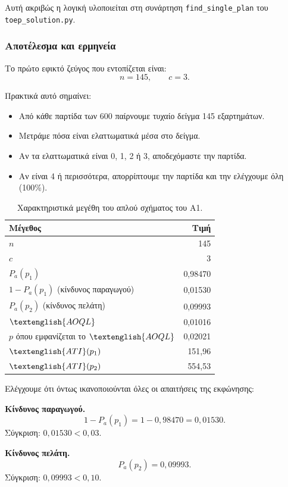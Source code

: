 \documentclass[12pt,a4paper]{article}
\newcommand{\code}[1]{\texttt{\textenglish{#1}}}
\newcommand{\Pa}{P_{\!a}}
\newcommand{\AOQL}{\textenglish{AOQL}}
\newcommand{\ATI}{\textenglish{ATI}}
\begin{document}
Αυτή ακριβώς η λογική υλοποιείται στη συνάρτηση
\code{find\_single\_plan} του \code{toep\_solution.py}.

\subsubsection*{Αποτέλεσμα και ερμηνεία}

Το πρώτο εφικτό ζεύγος που εντοπίζεται είναι:
\[
    \boxed{n=145,\qquad c=3}.
\]

Πρακτικά αυτό σημαίνει:

\begin{itemize}[leftmargin=2.2em]
    \item Από κάθε παρτίδα των 600 παίρνουμε τυχαίο δείγμα 145 εξαρτημάτων.
    \item Μετράμε πόσα είναι ελαττωματικά μέσα στο δείγμα.
    \item Αν τα ελαττωματικά είναι 0, 1, 2 ή 3, αποδεχόμαστε την παρτίδα.
    \item Αν είναι 4 ή περισσότερα, απορρίπτουμε την παρτίδα και την ελέγχουμε
    όλη (100\%).
\end{itemize}

\begin{table}[H]
\centering
\caption{Χαρακτηριστικά μεγέθη του απλού σχήματος του Α1.}
\begin{tabular}{lr}
\toprule
\textbf{Μέγεθος} & \textbf{Τιμή} \\
\midrule
\(n\) & 145 \\
\(c\) & 3 \\
\(\Pa(p_1)\) & 0,98470 \\
\(1-\Pa(p_1)\) (κίνδυνος παραγωγού) & 0,01530 \\
\(\Pa(p_2)\) (κίνδυνος πελάτη) & 0,09993 \\
\(\AOQL\) & 0,01016 \\
\(p\) όπου εμφανίζεται το \(\AOQL\) & 0,02021 \\
\(\ATI(p_1)\) & 151,96 \\
\(\ATI(p_2)\) & 554,53 \\
\bottomrule
\end{tabular}
\end{table}

Ελέγχουμε ότι όντως ικανοποιούνται όλες οι απαιτήσεις της εκφώνησης:

\textbf{Κίνδυνος παραγωγού.}
\[
    1-\Pa(p_1)=1-0{,}98470=0{,}01530.
\]
Σύγκριση: \(0{,}01530 < 0{,}03\). \checkmark

\textbf{Κίνδυνος πελάτη.}
\[
    \Pa(p_2)=0{,}09993.
\]
Σύγκριση: \(0{,}09993 < 0{,}10\). \checkmark
\end{document}

